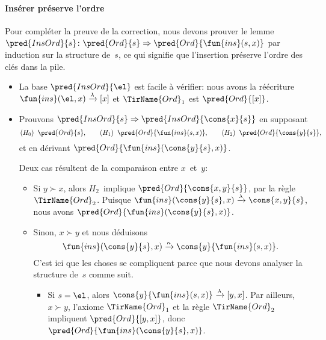 \paragraph{Insérer préserve l'ordre}

Pour compléter la preuve de la correction, nous devons prouver le
lemme~\(\pred{InsOrd}{s} \colon \pred{Ord}{s} \Rightarrow
\pred{Ord}{\fun{ins}(s,x)}\) par induction sur la
structure de~\(s\), ce qui signifie que
l'insertion préserve l'ordre des clés dans la pile.
\begin{itemize}

  \item La base \(\pred{InsOrd}{\el}\) est facile à vérifier: nous avons
  la réécriture \(\fun{ins}(\el,x) \xrightarrow{\smash{\lambda}} [x]\)
  et \(\TirName{Ord}_1\) est \(\pred{Ord}{[x]}\).

  \item Prouvons \(\pred{InsOrd}{s} \Rightarrow
    \pred{InsOrd}{\cons{x}{s}}\) en supposant
    \begin{equation*}
      (H_0) \;\; \pred{Ord}{s},\qquad
      (H_1) \;\; \pred{Ord}{\fun{ins}(s,x)},\qquad
      (H_2) \;\; \pred{Ord}{\cons{y}{s}},
    \end{equation*}
    et en dérivant \(\pred{Ord}{\fun{ins}(\cons{y}{s},x)}\).

    \noindent Deux cas résultent de la comparaison entre \(x\)~et~\(y\):
    \begin{itemize}

      \item Si \(y \succ x\), alors \(H_2\)~implique
      \(\pred{Ord}{\cons{x,y}{s}}\), par la règle
      \(\TirName{Ord}_2\). Puisque \(\fun{ins}(\cons{y}{s},x)
      \xrightarrow{\smash{\lambda}} \cons{x,y}{s}\), nous avons
      \(\pred{Ord}{\fun{ins}(\cons{y}{s},x)}\).

      \item Sinon, \(x \succ y\) et nous déduisons
      \begin{equation}
        \fun{ins}(\cons{y}{s},x) \xrightarrow{\smash{\kappa}}
        \cons{y}{\fun{ins}(s,x)}.\label{eq_A}
      \end{equation}
      C'est ici que les choses se compliquent parce que nous devons
      analyser la structure de~\(s\) comme suit.
      \begin{itemize}

      \item Si \(s=\el\), alors \(\cons{y}{\fun{ins}(s,x)}
        \xrightarrow{\smash{\lambda}} [y,x]\). Par ailleurs, \(x \succ
        y\), l'axiome \(\TirName{Ord}_1\) et la règle
        \(\TirName{Ord}_2\) impliquent \(\pred{Ord}{[y,x]}\), donc
        \(\pred{Ord}{\fun{ins}(\cons{y}{s},x)}\).


\end{itemize}
\end{itemize}
\end{itemize}
